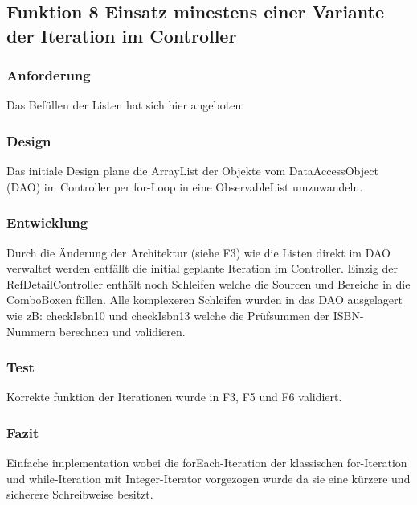 \subsection[Funktion 8 Iteration]{Funktion 8 Einsatz minestens einer Variante der Iteration im Controller}

\subsubsection{Anforderung}
Das Befüllen der Listen hat sich hier angeboten.

\subsubsection{Design}
Das initiale Design plane die ArrayList der Objekte vom DataAccessObject (DAO) im Controller per for-Loop in eine ObservableList umzuwandeln.

\subsubsection{Entwicklung}
Durch die Änderung der Architektur (siehe F3) wie die Listen direkt im DAO verwaltet werden entfällt die initial geplante Iteration im Controller. Einzig der RefDetailController enthält noch Schleifen welche die Sourcen und Bereiche in die ComboBoxen füllen. Alle komplexeren Schleifen wurden in das DAO ausgelagert wie zB: checkIsbn10 und checkIsbn13 welche die Prüfsummen der ISBN-Nummern berechnen und validieren.

\subsubsection{Test}
Korrekte funktion der Iterationen wurde in F3, F5 und F6 validiert.

\subsubsection{Fazit}
Einfache implementation wobei die forEach-Iteration der klassischen for-Iteration und while-Iteration mit Integer-Iterator vorgezogen wurde da sie eine kürzere und sicherere Schreibweise besitzt.